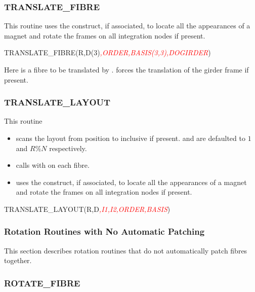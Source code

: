 \subsubsection*{TRANSLATE\_FIBRE}

%
This routine uses the  construct, if associated, to locate
all the appearances of a magnet and rotate the frames on all integration
nodes if present.

\begin{ptccode}
TRANSLATE_FIBRE(R,D(3)\textit{\textcolor{red}{,ORDER,BASIS(3,3),DOGIRDER}})
\end{ptccode}

Here  is a fibre to be translated by .  forces the
translation of the girder frame if present.


\subsubsection*{TRANSLATE\_LAYOUT}

%
This routine
\begin{itemize}
  \item scans the layout  from position  to  inclusive if
present.  and  are defaulted to $1$ and $R \% N$ respectively.
  \item calls  with 
on each fibre.
  \item uses the  construct, if associated, to locate all the appearances
of a magnet and rotate the frames on all integration nodes if present.
\end{itemize}

\begin{ptccode}
TRANSLATE_LAYOUT(R,D\textit{\textcolor{red}{,I1,I2,ORDER,BASIS}})
\end{ptccode}


\subsubsection{Rotation Routines with No Automatic Patching}

%
This section describes rotation routines that do not automatically patch 
fibres together.


\subsubsection*{ROTATE\_FIBRE}

